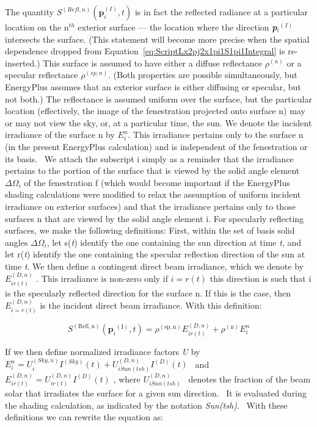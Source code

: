 The quantity \(S^{(Refl,n)} (\mathbf{p}_i^{(I)},t)\) is in fact the reflected radiance at a particular location on the n\(^{th}\) exterior surface --- the location where the direction \textbf{\emph{p}}\emph{\(_{i}\)}\(^{(I)}\) intersects the surface. (This statement will become more precise when the spatial dependence dropped from Equation~\ref{eq:ScriptLx2pj2x1pi1S1pi1Integral} is re-inserted.) This surface is assumed to have either a diffuse reflectance \(\rho\)\(^{(n)}\) or a specular reflectance \(\rho\)\(^{(sp, n)}\). (Both properties are possible simultaneously, but EnergyPlus assumes that an exterior surface is either diffusing or specular, but not both.) The reflectance is assumed uniform over the surface, but the particular location (effectively, the image of the fenestration projected onto surface n) may or may not view the sky, or, at a particular time, the sun. We denote the incident irradiance of the surface n by \(E_i^n\). This irradiance pertains only to the surface n (in the present EnergyPlus calculation) and is independent of the fenestration or its basis.~ We attach the subscript i simply as a reminder that the irradiance pertains to the portion of the surface that is viewed by the solid angle element \(\Delta {\Omega_i}\) of the fenestration f (which would become important if the EnergyPlus shading calculations were modified to relax the assumption of uniform incident irradiance on exterior surfaces) and that the irradiance pertains only to those surfaces n that are viewed by the solid angle element i. For specularly reflecting surfaces, we make the following definitions: First, within the set of basis solid angles \(\Delta {\Omega_i}\), let s(\emph{t}) identify the one containing the sun direction at time \emph{t}, and let r(\emph{t}) identify the one containing the specular reflection direction of the sun at time \emph{t}. We then define a contingent direct beam irradiance, which we denote by \(E_{i{\mathrm{ }}r(t)}^{(D,n)}\) . This irradiance is non-zero only if \(i = r(t)\) this direction is such that i is the specularly reflected direction for the surface n. If this is the case, then \(E_{i = r(t)}^{(D,n)}\) is the incident direct beam irradiance. With this definition:

\begin{equation}
{S^{{\mathrm{(Refl, n)}}}}({{\mathbf{p}}_i}^{{\mathrm{(I)}}},t) = {\rho ^{{\mathrm{(sp, n)}}}}E_{i{\mathrm{ }}r(t)}^{(D,n)} + {\rho ^{{\mathrm{(n)}}}}E_i^n
\end{equation}

If we then define normalized irradiance factors \emph{U} by \(E_i^n = U_i^{(Sky,n)}{I^{(Sky)}}(t) + U_{i{\mathrm{ }}Sun(tsh)}^{(D,n)}{I^{(D)}}(t)\) ~and \(E_{i{\mathrm{ }}r(t)}^{(D,n)} = U_{i{\mathrm{ }}r(t)}^{(D,n)}{I^{(D)}}(t)\) , where \(U_{i{\mathrm{ }}Sun(tsh)}^{(D,n)}\) ~denotes the fraction of the beam solar that irradiates the surface for a given sun direction.~ It is evaluated during the shading calculation, as indicated by the notation \emph{Sun(tsh)}.~ With these definitions we can rewrite the equation as:

